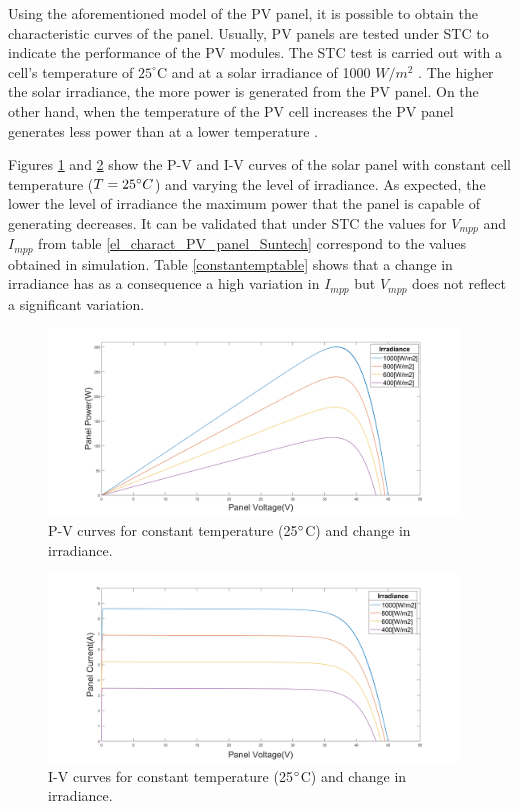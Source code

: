 Using the aforementioned model of the PV panel, it is possible to obtain the characteristic curves of the panel.  Usually, PV panels are tested under STC to indicate the performance of the PV modules. The STC test is carried out with a cell's temperature of $25^\circ$C and at a solar irradiance of 1000 $W/ m^2$ \cite{handbook}. The higher the solar irradiance, the more power is generated from the PV panel. On the other hand, when the temperature of the PV cell increases the PV panel generates less power than at a lower temperature \cite{handbook}. 

Figures \ref{fig:PVcurves_T25} and \ref{fig:IVcurves_T25} show the P-V and I-V curves of the solar panel with constant cell temperature ($T=25\dec C$) and varying the level of irradiance. 
As expected, the lower the level of irradiance the maximum power that the panel is capable of generating decreases. It can be validated that under STC the values for $V_{mpp}$ and $I_{mpp}$ from table \ref{el_charact_PV_panel_Suntech}  correspond to the values obtained in simulation. Table \ref{constantemptable} shows that a change in irradiance has as a consequence a high variation in $I_{mpp}$ but $V_{mpp}$ does not reflect a significant variation.  


\begin{figure}[H]
	\begin{center}
		\includegraphics[width=0.97\textwidth]{../Pictures/constant_temperature}
		\caption{P-V curves for constant temperature (25$\dec$C) and change in irradiance.}
		\label{fig:PVcurves_T25} 
	\end{center}	
\end{figure}

\begin{figure}[H]
	\begin{center}
		\includegraphics[width=0.97\textwidth]{../Pictures/constant_temperature_iv}
		\caption{I-V curves for constant temperature (25$\dec$C) and change in irradiance.}
		\label{fig:IVcurves_T25} 
	\end{center}	
\end{figure}


